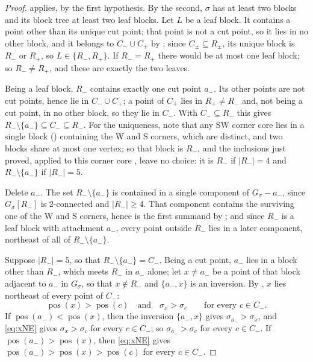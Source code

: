 \documentclass[12pt]{article}
\def\xspace{ }%
\theoremstyle{definition}
\newcommand{\pos}{\operatorname{pos}}  %
\newcommand{\Wcr}{W\xspace}    %
\newcommand{\Scr}{S\xspace}    %
\newcommand{\SWcr}{SW\xspace}  %
\newcommand{\core}{corner core\xspace}
\newcommand{\Cm}{C_{-}}
\newcommand{\Cp}{C_{+}}
\newcommand{\Cpm}{C_{\pm}}
\newcommand{\Rm}{R_{-}}
\newcommand{\Rp}{R_{+}}
\newcommand{\Rpm}{R_{\pm}}
\newcommand{\igr}{G}                      %
\begin{document}
\begin{proof}
 applies, by the first hypothesis. By the second,
$\sigma$ has at least two blocks and its block tree at least two leaf
blocks. Let $L$ be a leaf block. It contains a point
other than its unique cut point; that point is not a cut point, so it lies in no
other block, and it belongs to $\Cm \cup \Cp$ by ; since $\Cpm \subseteq \Rpm$, its unique block is
$\Rm$ or $\Rp$, so $L \in \{\Rm,\Rp\}$. If $\Rm = \Rp$ there would be at
most one leaf block; so $\Rm \ne \Rp$, and these are exactly the two
leaves.

Being a leaf block, $\Rm$ contains exactly one cut point $a_-$. Its
other points are not cut points, hence lie in $\Cm \cup \Cp$; a point of $\Cp$
lies in $\Rp \ne \Rm$ and, not being a cut point, in no other block, so they lie
in $\Cm$. With $\Cm \subseteq \Rm$ this gives $\Rm \setminus \{a_-\}
\subseteq \Cm \subseteq \Rm$. For the uniqueness, note that any \SWcr \core{}
lies in a single block () containing the \Wcr and \Scr corners,
which are distinct, and two blocks share at most one vertex; so that block is
$\Rm$, and the inclusions just proved, applied to this \core, leave no choice:
it is $\Rm$ if $|\Rm| = 4$ and $\Rm \setminus \{a_-\}$ if $|\Rm| = 5$.

 Delete $a_-$. The set $\Rm \setminus \{a_-\}$ is
contained in a single component of $\igr_\sigma - a_-$, since
$\igr_\sigma[\Rm]$ is $2$-connected and $|\Rm| \ge 4$. That component
contains the surviving one of
the \Wcr and \Scr corners, hence is the first summand by
; and since $\Rm$ is a leaf block with attachment
$a_-$, every point outside $\Rm$ lies in a later component, northeast of
all of $\Rm \setminus \{a_-\}$.

 Suppose $|\Rm| = 5$, so that $\Rm \setminus
\{a_-\} = \Cm$. Being a cut point, $a_-$ lies in a block other than
$\Rm$, which meets
$\Rm$ in $a_-$ alone; let $x \ne a_-$ be a point of that block adjacent to
$a_-$ in $\igr_\sigma$, so that $x \notin \Rm$ and $\{a_-,x\}$ is an inversion. By
, $x$ lies northeast of every point
of $\Cm$:
\begin{equation}\label{eq:xNE}
   \pos(x) > \pos(c) \quad\text{and}\quad \sigma_x > \sigma_c
   \qquad \text{for every } c \in \Cm .
\end{equation}
If $\pos(a_-) < \pos(x)$, then the inversion $\{a_-,x\}$ gives
$\sigma_{a_-} > \sigma_x$, and \cref{eq:xNE} gives $\sigma_x > \sigma_c$ for every $c
\in \Cm$; so $\sigma_{a_-} > \sigma_c$ for every $c \in \Cm$. If $\pos(a_-) >
\pos(x)$, then \cref{eq:xNE} gives $\pos(a_-) > \pos(x) > \pos(c)$ for
every $c \in \Cm$.


\end{proof}
\end{document}
